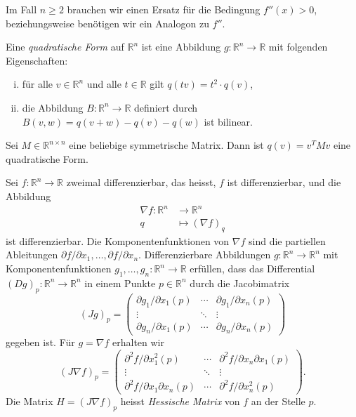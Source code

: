 \documentclass[../main.tex]{subfiles}
\begin{document}
Im Fall $n \geq 2$ brauchen wir einen
Ersatz für die Bedingung $f''(x) > 0$, beziehungsweise
benötigen wir ein Analogon zu $f''$.

\begin{definition}
  Eine \emph{quadratische Form} auf $\mathbb{R}^n$
  ist eine Abbildung $g \colon \mathbb{R}^n \to \mathbb{R}$
  mit folgenden Eigenschaften:
  \begin{enumerate}[(i)]
    \item für alle $v \in \mathbb{R}^n$
      und alle $t \in \mathbb{R}$ gilt $q(tv) = t^2 \cdot q(v)$,
    \item die Abbildung
      $B \colon \mathbb{R}^n \to \mathbb{R}$
      definiert durch $B(v, w) = q(v + w) - q(v) - q(w)$
      ist bilinear.
  \end{enumerate}
\end{definition}

\begin{example}
  Sei $M \in \mathbb{R}^{n \times n}$ eine beliebige
  symmetrische Matrix.
  Dann ist $q(v) = v^T M v$ eine quadratische Form.
\end{example}

Sei $f \colon \mathbb{R}^n \to \mathbb{R}$ zweimal differenzierbar, das heisst,
$f$ ist differenzierbar, und die Abbildung
\begin{align*}
  \nabla f \colon \mathbb{R}^n & \to \mathbb{R}^n \\
  q & \mapsto {(\nabla f)}_q
\end{align*}
ist differenzierbar.
Die Komponentenfunktionen von $\nabla f$ sind die
partiellen Ableitungen $\partial f / \partial x_1, \dots,
\partial f / \partial x_n$.
Differenzierbare Abbildungen
$g \colon \mathbb{R}^n \to \mathbb{R}^n$ mit
Komponentenfunktionen $g_1, \dots, g_n \colon \mathbb{R}^n \to \mathbb{R}$
erfüllen, dass das Differential ${(Dg)}_p \colon \mathbb{R}^n \to \mathbb{R}^n$
in einem Punkte $p \in \mathbb{R}^n$ durch die
Jacobimatrix
\[
{(Jg)}_p =
\begin{pmatrix}
  \partial g_1 / \partial x_1 (p) & \cdots & \partial g_1/\partial x_n (p) \\
  \vdots & \ddots & \vdots \\
  \partial g_n / \partial x_1 (p) & \cdots & \partial g_n / \partial x_n (p)
\end{pmatrix}
\]
gegeben ist.
Für $g = \nabla f$ erhalten wir
\[
  {(J \nabla f )}_p =
  \begin{pmatrix}
    \partial^2 f / \partial x_1^2 (p)
    & \cdots
    & \partial^2 f / \partial x_n \partial x_1 (p) \\
    \vdots & \ddots & \vdots \\
    \partial^2 f / \partial x_1 \partial x_n (p)
    & \cdots
    & \partial^2 f / \partial x_n^2 (p)
  \end{pmatrix}.
\]
Die Matrix $H = {(J \nabla f)}_p$ heisst \emph{Hessische Matrix}
von $f$ an der Stelle $p$.
\end{document}
